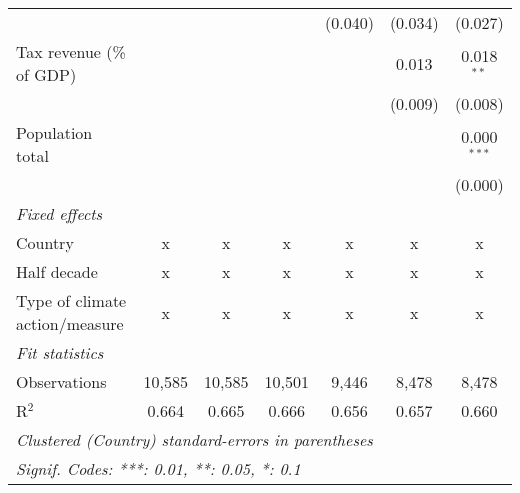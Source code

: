 \begin{tabular}{lcccccc}
                                                  &         &                &                & (0.040)        & (0.034)        & (0.027)\\   
   Tax revenue (\% of GDP)                        &         &                &                &                & 0.013          & 0.018$^{**}$\\   
                                                  &         &                &                &                & (0.009)        & (0.008)\\   
   Population total                               &         &                &                &                &                & 0.000$^{***}$\\   
                                                  &         &                &                &                &                & (0.000)\\   
   \emph{Fixed effects}\\
   Country                                        & x       & x              & x              & x              & x              & x\\  
   Half decade                                    & x       & x              & x              & x              & x              & x\\  
   Type of climate action/measure                 & x       & x              & x              & x              & x              & x\\  
   \midrule \emph{Fit statistics}\\
   Observations                                   & 10,585  & 10,585         & 10,501         & 9,446          & 8,478          & 8,478\\  
   R$^2$                                          & 0.664   & 0.665          & 0.666          & 0.656          & 0.657          & 0.660\\  
   \midrule
   \multicolumn{7}{l}{\emph{Clustered (Country) standard-errors in parentheses}}\\
   \multicolumn{7}{l}{\emph{Signif. Codes: ***: 0.01, **: 0.05, *: 0.1}}\\
\end{tabular}
\par\endgroup


